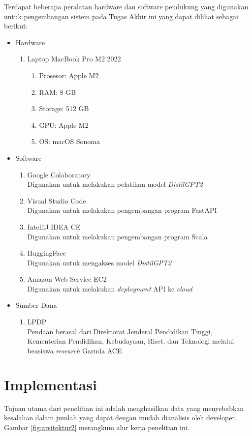 Terdapat beberapa peralatan hardware dan software pendukung yang digunakan untuk pengembangan sistem pada Tugas Akhir ini yang dapat dilihat sebagai berikut:
\begin{itemize}[topsep=0pt]
  \item Hardware
  \begin{enumerate}[topsep=0pt]
    \item Laptop MacBook Pro M2 2022
    \begin{enumerate}[topsep=0pt]
      \item Prosesor: Apple M2
      \item RAM: 8 GB
      \item Storage: 512 GB
      \item GPU: Apple M2
      \item OS: macOS Sonoma
    \end{enumerate}
  \end{enumerate}
  \item Software
  \begin{enumerate}[topsep=0pt]
    \item Google Colaboratory\\
    Digunakan untuk melakukan pelatihan model \emph{DistilGPT2}
    \item Visual Studio Code\\
    Digunakan untuk melakukan pengembangan program FastAPI
    \item IntelliJ IDEA CE\\
    Digunakan untuk melakukan pengembangan program Scala
    \item HuggingFace\\
    Digunakan untuk mengakses model \emph{DistilGPT2}
    \item Amazon Web Service EC2\\
    Digunakan untuk melakukan \emph{deployment} 
    API ke \emph{cloud}
  \end{enumerate}
  \item Sumber Dana
  \begin{enumerate}[topsep=0pt]
    \item LPDP\\  
    Pendaan berasal dari Direktorat Jenderal Pendidikan Tinggi,
    Kementerian Pendidikan, Kebudayaan, Riset, dan Teknologi
    melalui beasiswa \emph{research} Garuda ACE
  \end{enumerate}
\end{itemize}
\section{Implementasi}
\label{sec:implementasi}
Tujuan utama dari penelitian ini adalah menghasilkan data 
yang menyebabkan kesalahan dalam jumlah yang dapat dengan 
mudah dianalisis oleh developer. 
Gambar \ref{fig:arsitektur2} merangkum alur 
kerja penelitian ini. 

